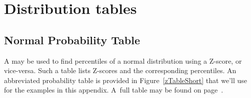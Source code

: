 \chapter{Distribution tables}
\label{distributionTables}

\section{Normal Probability Table}
\label{normalProbabilityTable}

A  may be used to
find percentiles of a normal distribution using a Z-score,
or vice-versa.
Such a table lists Z-scores and the corresponding percentiles.
An abbreviated probability table is provided in
Figure~\ref{zTableShort} that we'll use for the examples
in this appendix.
A~full table may be found on page~\pageref{normTableSide1}.

